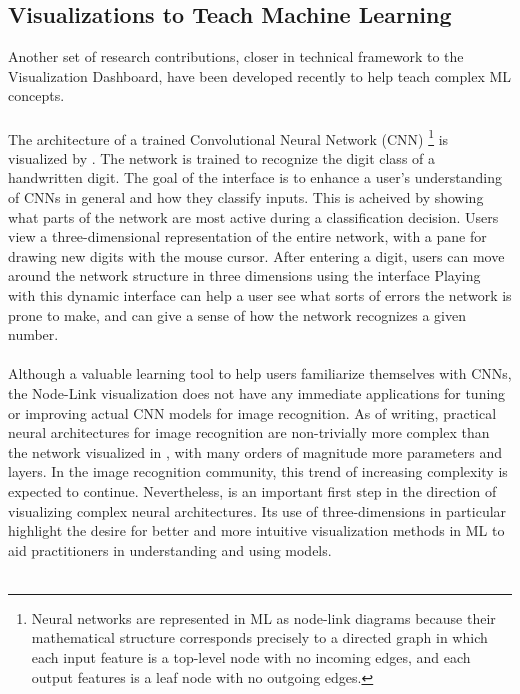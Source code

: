 \documentclass{sigchi}
\begin{document}
\subsection{Visualizations to Teach Machine Learning}
%
%
Another set of research contributions, closer in technical framework to the Visualization Dashboard, have been developed recently to help teach complex ML concepts.
%
\\\\%
%
The architecture of a trained Convolutional Neural Network (CNN)%
%
\footnote{Neural networks are represented in ML as node-link diagrams because their mathematical structure corresponds precisely to a directed graph in which each input feature is a top-level node with no incoming edges, and each output features is a leaf node with no outgoing edges.} %
%
is visualized by \cite{harley2015interactive}. %
%
The network is trained to recognize the digit class of a handwritten digit. %
%
The goal of the interface is to enhance a user's understanding of CNNs in general and how they classify inputs. %
%
This is acheived by showing what parts of the network are most active during a classification decision. %
%
Users view a three-dimensional representation of the entire network, with a pane for drawing new digits with the mouse cursor. %
%
After entering a digit, users can move around the network structure in three dimensions using the interface %
%
Playing with this dynamic interface can help a user see what sorts of errors the network is prone to make, and can give a sense of how the network recognizes a given number. %
%
\\\\
%
Although a valuable learning tool to help users familiarize themselves with CNNs, the Node-Link visualization does not have any immediate applications for tuning or improving actual CNN models for image recognition. %
%
As of writing, practical neural architectures for image recognition are non-trivially more complex than the network visualized in \cite{harley2015interactive}, with many orders of magnitude more parameters and layers. %
%
In the image recognition community, this trend of increasing complexity is expected to continue. %
%
Nevertheless, \cite{harley2015interactive} is an important first step in the direction of visualizing complex neural architectures. %
%
Its use of three-dimensions in particular highlight the desire for better and more intuitive visualization methods in ML to aid practitioners in understanding and using models.%
%
\\\\
\end{document}
